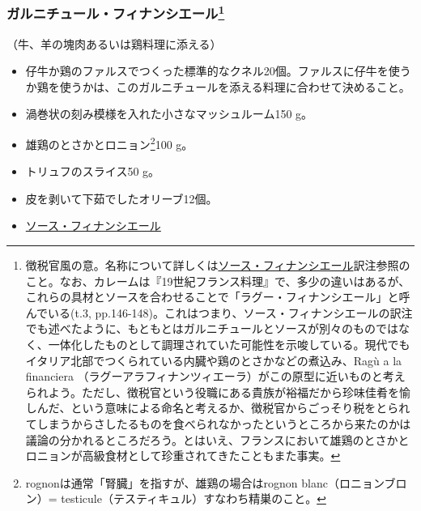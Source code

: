 \begin{recette}
\hypertarget{garniture-a-la-financiere}{%
\subsubsection[ガルニチュール・フィナンシエール]{\texorpdfstring{ガルニチュール・フィナンシエール\footnote{徴税官風の意。名称について詳しくは\protect\hyperlink{sauce-financiere}{ソース・フィナンシエール}訳注参照のこと。なお、カレームは『19世紀フランス料理』で、多少の違いはあるが、これらの具材とソースを合わせることで「ラグー・フィナンシエール」と呼んでいる(t.3,
  pp.146-148)。これはつまり、ソース・フィナンシエールの訳注でも述べたように、もともとはガルニチュールとソースが別々のものではなく、一体化したものとして調理されていた可能性を示唆している。現代でもイタリア北部でつくられている内臓や鶏のとさかなどの煮込み、Ragù
  a la financiera
  （ラグーアラフィナンツィエーラ）がこの原型に近いものと考えられよう。ただし、徴税官という役職にある貴族が裕福だから珍味佳肴を愉しんだ、という意味による命名と考えるか、徴税官からごっそり税をとられてしまうからさしたるものを食べられなかったというところから来たのかは議論の分かれるところだろう。とはいえ、フランスにおいて雄鶏のとさかとロニョンが高級食材として珍重されてきたこともまた事実。}}{ガルニチュール・フィナンシエール}}\label{garniture-a-la-financiere}}



（牛、羊の塊肉あるいは鶏料理に添える）

\begin{itemize}
\item
  仔牛か鶏のファルスでつくった標準的なクネル20個。ファルスに仔牛を使うか鶏を使うかは、このガルニチュールを添える料理に合わせて決めること。
\item
  渦巻状の刻み模様を入れた小さなマッシュルーム150 g。
\item
  雄鶏のとさかとロニョン\footnote{rognonは通常「腎臓」を指すが、雄鶏の場合はrognon
    blanc（ロニョンブロン）=
    testicule（テスティキュル）すなわち精巣のこと。}100 g。
\item
  トリュフのスライス50 g。
\item
  皮を剥いて下茹でしたオリーブ12個。
\item
  \protect\hyperlink{sauce-financiere}{ソース・フィナンシエール}
\end{itemize}


\end{recette}

